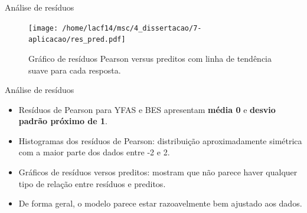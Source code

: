 \documentclass[
  ignorenonframetext,
  serif,
  professionalfont,
  usenames,
  dvipsnames,
  aspectratio = 169]{beamer}
\begin{document}
\begin{frame}{Análise de resíduos}
\protect\hypertarget{anuxe1lise-de-resuxedduos-1}{}
\begin{figure}[H]
\centering
\texttt{[image: /home/lacf14/msc/4\_dissertacao/7-aplicacao/res\_pred.pdf]}
\caption{Gráfico de resíduos Pearson versus preditos com linha de tendência suave para cada resposta.}
\label{fig:diagnostico2}
\end{figure}
\end{frame}

\begin{frame}{Análise de resíduos}
\protect\hypertarget{anuxe1lise-de-resuxedduos-2}{}
\begin{itemize}
  \itemsep 2ex
  
  \item Resíduos de Pearson para YFAS e BES apresentam \textbf{média 0} e \textbf{desvio padrão próximo de 1}. 

  \item Histogramas dos resíduos de Pearson: distribuição aproximadamente simétrica com a maior parte dos dados entre -2 e 2.

  \item Gráficos de resíduos versos preditos: mostram que não parece haver qualquer tipo de relação entre resíduos e preditos. 

  \item De forma geral, o modelo parece estar razoavelmente bem ajustado aos dados.
  
\end{itemize}
\end{frame}
\end{document}
